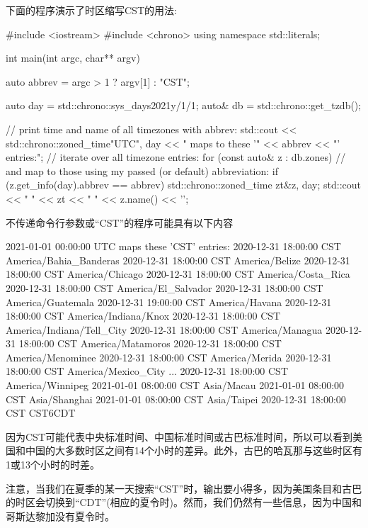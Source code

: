下面的程序演示了时区缩写CST的用法:


\begin{cpp}
#include <iostream>
#include <chrono>
using namespace std::literals;

int main(int argc, char** argv)
{
	auto abbrev = argc > 1 ? argv[1] : "CST";
	
	auto day = std::chrono::sys_days{2021y/1/1};
	auto& db = std::chrono::get_tzdb();
	
	// print time and name of all timezones with abbrev:
	std::cout << std::chrono::zoned_time{"UTC", day}
			  << " maps to these '" << abbrev << "' entries:\n";
	// iterate over all timezone entries:
	for (const auto& z : db.zones) {
		// and map to those using my passed (or default) abbreviation:
		if (z.get_info(day).abbrev == abbrev) {
			std::chrono::zoned_time zt{&z, day};
			std::cout << " " << zt << " " << z.name() << '\n';
		}
	}
}
\end{cpp}

不传递命令行参数或“CST”的程序可能具有以下内容

\begin{shell}
2021-01-01 00:00:00 UTC maps these ’CST’ entries:
  2020-12-31 18:00:00 CST America/Bahia_Banderas
  2020-12-31 18:00:00 CST America/Belize
  2020-12-31 18:00:00 CST America/Chicago
  2020-12-31 18:00:00 CST America/Costa_Rica
  2020-12-31 18:00:00 CST America/El_Salvador
  2020-12-31 18:00:00 CST America/Guatemala
  2020-12-31 19:00:00 CST America/Havana
  2020-12-31 18:00:00 CST America/Indiana/Knox
  2020-12-31 18:00:00 CST America/Indiana/Tell_City
  2020-12-31 18:00:00 CST America/Managua
  2020-12-31 18:00:00 CST America/Matamoros
  2020-12-31 18:00:00 CST America/Menominee
  2020-12-31 18:00:00 CST America/Merida
  2020-12-31 18:00:00 CST America/Mexico_City
  ...
  2020-12-31 18:00:00 CST America/Winnipeg
  2021-01-01 08:00:00 CST Asia/Macau
  2021-01-01 08:00:00 CST Asia/Shanghai
  2021-01-01 08:00:00 CST Asia/Taipei
  2020-12-31 18:00:00 CST CST6CDT
\end{shell}

因为CST可能代表中央标准时间、中国标准时间或古巴标准时间，所以可以看到美国和中国的大多数时区之间有14个小时的差异。此外，古巴的哈瓦那与这些时区有1或13个小时的时差。

注意，当我们在夏季的某一天搜索“CST”时，输出要小得多，因为美国条目和古巴的时区会切换到“CDT”(相应的夏令时)。然而，我们仍然有一些信息，因为中国和哥斯达黎加没有夏令时。

